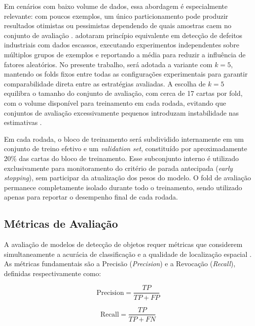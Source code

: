 \documentclass[
    12pt,                %
    openright,           %
    oneside,             %
    a4paper,             %
    english,             %
    brazil               %
]{abntex2}
\begin{document}
Em cenários com baixo volume de dados, essa abordagem é especialmente
relevante: com poucos exemplos, um único particionamento pode
produzir resultados otimistas ou pessimistas dependendo de quais
amostras caem no conjunto de avaliação \cite{Kohavi1995}.
 adotaram princípio equivalente em detecção de
defeitos industriais com dados escassos, executando experimentos
independentes sobre múltiplos grupos de exemplos e reportando a média
para reduzir a influência de fatores aleatórios. No presente trabalho,
será adotada a variante com $k{=}5$, mantendo os folds fixos entre
todas as configurações experimentais para garantir comparabilidade
direta entre as estratégias avaliadas. A escolha de $k{=}5$ equilibra
o tamanho do conjunto de avaliação, com cerca de 17 cartas por fold,
com o volume disponível para treinamento em cada rodada, evitando que
conjuntos de avaliação excessivamente pequenos introduzam instabilidade
nas estimativas \cite{Kohavi1995}.

Em cada rodada, o bloco de treinamento será subdividido internamente
em um conjunto de treino efetivo e um \textit{validation set},
constituído por aproximadamente 20\% das cartas do bloco de
treinamento. Esse subconjunto interno é utilizado exclusivamente
para monitoramento do critério de parada antecipada
(\textit{early stopping}), sem participar da atualização dos pesos
do modelo. O fold de avaliação permanece completamente isolado durante
todo o treinamento, sendo utilizado apenas para reportar o desempenho
final de cada rodada.

\subsection{Métricas de Avaliação}
\label{subsec:metricas}

A avaliação de modelos de detecção de objetos requer métricas
que considerem simultaneamente a acurácia de classificação
e a qualidade de localização espacial \cite{Ramos2025}.
As métricas fundamentais são a Precisão (\textit{Precision})
e a Revocação (\textit{Recall}), definidas respectivamente
como:

\begin{equation}
    \text{Precision} = \frac{TP}{TP + FP}
\end{equation}

\begin{equation}
    \text{Recall} = \frac{TP}{TP + FN}
\end{equation}
\end{document}
